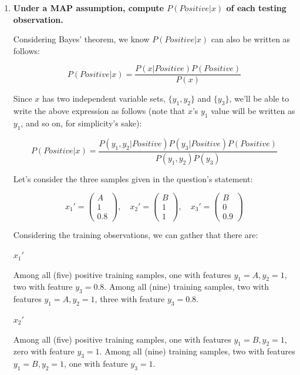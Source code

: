 \documentclass[12pt]{article}
\begin{document}
\begin{enumerate}[leftmargin=\labelsep]
  \pagebreak

  \item \textbf{Under a MAP assumption, compute $P(Positive | x)$ of each testing observation.}

  Considering Bayes' theorem, we know $P(Positive | x)$ can also be written as follows:

  $$
  P(Positive | x) = \frac{P(x| Positive) P(Positive)}{P(x)}
  $$

  Since $x$ has two independent variable sets, $\{y_1, y_2\}$ and $\{y_3\}$, we'll be
  able to write the above expression as follows (note that $x$'s $y_1$ value will
  be written as $y_1$, and so on, for simplicity's sake):

  $$
  P(Positive | x) = \frac{P(y_1, y_2| Positive) P(y_3| Positive) P(Positive)}{P(y_1, y_2) P(y_3)}
  $$

  Let's consider the three samples given in the question's statement:

  $$
    x_1' = \begin{pmatrix}
      A \\
      1 \\
      0.8
    \end{pmatrix}, \quad
    x_2' = \begin{pmatrix}
      B \\
      1 \\
      1
    \end{pmatrix}, \quad
    x_3' = \begin{pmatrix}
      B \\
      0 \\
      0.9
    \end{pmatrix}
  $$

  Considering the training observations, we can gather that there are:

  \begin{multicols}{3}
    \setlength{\columnseprule}{1pt}
    \def\columnseprulecolor{\color{black}}
    \centering

    $x_1'$

    Among all (five) positive training samples, one with features $y_1 = A, y_2 = 1$,
    two with feature $y_3 = 0.8$.
    Among all (nine) training samples, two with features $y_1 = A, y_2 = 1$, three
    with feature $y_3 = 0.8$.

    \columnbreak

    $x_2'$

    Among all (five) positive training samples, one with features $y_1 = B, y_2 = 1$,
    zero with feature $y_3 = 1$.
    Among all (nine) training samples, two with features $y_1 = B, y_2 = 1$, one
    with feature $y_3 = 1$.


\end{multicols}
\end{enumerate}
\end{document}
